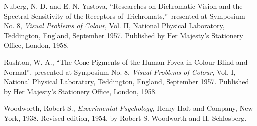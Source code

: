 Nuberg, N. D. and E. N. Yustova, “Researches on Dichromatic Vision and the Spectral Sensitivity of the Receptors of Trichromats,” presented at Symposium No. 8, \textit{Visual Problems of Colour}, Vol. II, National Physical Laboratory, Teddington, England, September 1957. Published by Her Majesty's Stationery Office, London, 1958.

Rushton, W. A., “The Cone Pigments of the Human Fovea in Colour Blind and Normal”, presented at Symposium No. 8, \textit{Visual Problems of Colour}, Vol. I, National Physical Laboratory, Teddington, England, September 1957. Published by Her Majesty's Stationery Office, London, 1958.

Woodworth, Robert S., \textit{Experimental Psychology}, Henry Holt and Company, New York, 1938. Revised edition, 1954, by Robert S. Woodworth and H. Schlosberg.

\normalsize